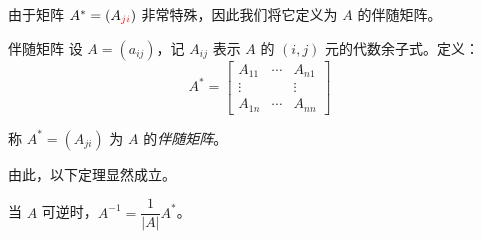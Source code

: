 由于矩阵 $A^* = (A_{\textcolor{red}{ji}})$ 非常特殊，因此我们将它定义为 $A$ 的伴随矩阵。

\begin{definition}{伴随矩阵}
	设 $A = (a_{ij})$，记 $A_{ij}$ 表示 $A$ 的 $(i, j)$ 元的代数余子式。定义：
	$$
	A^* =
	\begin{bmatrix}
		A_{11} & \cdots & A_{n1}
		\\
		\vdots & & \vdots
		\\
		A_{1n} & \cdots & A_{nn}
	\end{bmatrix}
	$$

	称 $A^* = (A_{ji})$ 为 $A$ 的\emph{伴随矩阵}。
\end{definition}

由此，以下定理显然成立。

\begin{theorem}
	当 $A$ 可逆时，$A^{-1} = \dfrac{1}{|A|} A^*$。
\end{theorem}